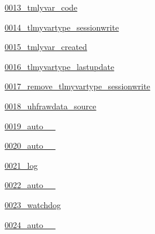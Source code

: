 \begin{DoxyCompactItemize}
\item 
 \hyperlink{namespace_ground_segment_1_1migrations_1_10013__tmlyvar__code}{0013\+\_\+tmlyvar\+\_\+code}
\item 
 \hyperlink{namespace_ground_segment_1_1migrations_1_10014__tlmyvartype__sessionwrite}{0014\+\_\+tlmyvartype\+\_\+sessionwrite}
\item 
 \hyperlink{namespace_ground_segment_1_1migrations_1_10015__tmlyvar__created}{0015\+\_\+tmlyvar\+\_\+created}
\item 
 \hyperlink{namespace_ground_segment_1_1migrations_1_10016__tlmyvartype__lastupdate}{0016\+\_\+tlmyvartype\+\_\+lastupdate}
\item 
 \hyperlink{namespace_ground_segment_1_1migrations_1_10017__remove__tlmyvartype__sessionwrite}{0017\+\_\+remove\+\_\+tlmyvartype\+\_\+sessionwrite}
\item 
 \hyperlink{namespace_ground_segment_1_1migrations_1_10018__uhfrawdata__source}{0018\+\_\+uhfrawdata\+\_\+source}
\item 
 \hyperlink{namespace_ground_segment_1_1migrations_1_10019__auto__20161202__1004}{0019\+\_\+auto\+\_\+\_}
\item 
 \hyperlink{namespace_ground_segment_1_1migrations_1_10020__auto__20161202__1040}{0020\+\_\+auto\+\_\+\_}
\item 
 \hyperlink{namespace_ground_segment_1_1migrations_1_10021__log}{0021\+\_\+log}
\item 
 \hyperlink{namespace_ground_segment_1_1migrations_1_10022__auto__20161202__1258}{0022\+\_\+auto\+\_\+\_}
\item 
 \hyperlink{namespace_ground_segment_1_1migrations_1_10023__watchdog}{0023\+\_\+watchdog}
\item 
 \hyperlink{namespace_ground_segment_1_1migrations_1_10024__auto__20161204__1335}{0024\+\_\+auto\+\_\+\_}
\end{DoxyCompactItemize}
